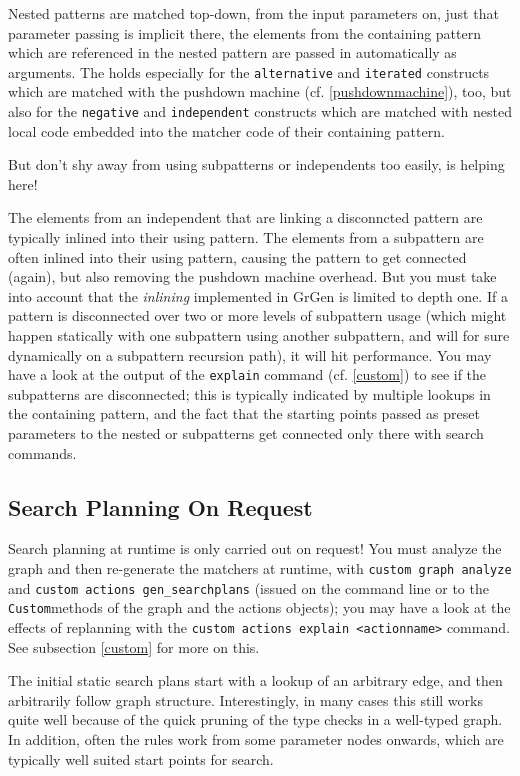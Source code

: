 Nested patterns are matched top-down, from the input parameters on, just that parameter passing is implicit there, the elements from the containing pattern which are referenced in the nested pattern are passed in automatically as arguments.
The holds especially for the \texttt{alternative} and \texttt{iterated} constructs which are matched with the pushdown machine (cf. \ref{pushdownmachine}), too, but also for the \texttt{negative} and \texttt{independent} constructs which are matched with nested local code embedded into the matcher code of their containing pattern.

But don't shy away from using subpatterns or independents too easily,  is helping here!

The elements from an independent that are linking a disconncted pattern are typically inlined into their using pattern.
The elements from a subpattern are often inlined into their using pattern, causing the pattern to get connected (again), 
but also removing the pushdown machine overhead.
But you must take into account that the \emph{inlining} implemented in GrGen is limited to depth one.
If a pattern is disconnected over two or more levels of subpattern usage (which might happen statically with one subpattern using another subpattern, and will for sure dynamically on a subpattern recursion path), it will hit performance.
You may have a look at the output of the \texttt{explain} command (cf. \ref{custom}) to see if the subpatterns are disconnected; this is typically indicated by multiple lookups in the containing pattern, and the fact that the starting points passed as preset parameters to the nested or subpatterns get connected only there with search commands.


\subsection{Search Planning On Request}
Search planning at runtime is only carried out on request!
You must analyze the graph and then re-generate the matchers at runtime,
with \texttt{custom graph analyze} and \texttt{custom actions gen\_searchplans} (issued on the command line or to the \texttt{Custom}methods of the graph and the actions objects);
you may have a look at the effects of replanning with the \texttt{custom actions explain <actionname>} command.
See subsection \ref{custom} for more on this.

The initial static search plans start with a lookup of an arbitrary edge, and then arbitrarily follow graph structure.
Interestingly, in many cases this still works quite well because of the quick pruning of the type checks in a well-typed graph.
In addition, often the rules work from some parameter nodes onwards, which are typically well suited start points for search.


